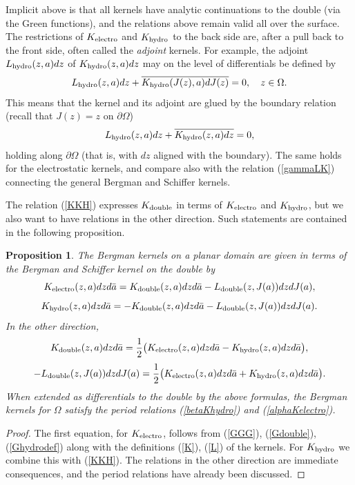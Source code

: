 \documentclass[reqno,12pt]{article}
\theoremstyle{plain}
\newtheorem{proposition}[thm]{Proposition}
\theoremstyle{definition}
\numberwithin{equation}{section}
\numberwithin{figure}{section}
\begin{document}
Implicit above is that all kernels have analytic continuations to the double (via the Green functions),
and the relations above remain valid all over the surface. The restrictions of $K_{\rm electro}$ and $K_{\rm hydro}$ 
to the back side are, after a pull back to the front side, often called the {\it adjoint} kernels.
For example, the adjoint $L_{\rm hydro}(z,a)dz$ of $K_{\rm hydro}(z,a)dz$ may  on the level of differentials be defined by 
\begin{equation}\label{adjointBergmanhydro}
L_{\rm hydro}(z,a)dz+\overline{K_{\rm hydro}(J(z),a)dJ(z)}=0, \quad z\in\Omega.
\end{equation}
This means that the kernel and its adjoint are glued by the boundary relation (recall that $J(z)=z$ on $\partial\Omega$)
\begin{equation}\label{LKboundary}
L_{\rm hydro}(z,a)dz+\overline{K_{\rm hydro}(z,a)dz}=0, 
\end{equation}
holding along $\partial\Omega$ (that is, with $dz$ aligned with the boundary). 
The same holds for the electrostatic kernels, and compare also with the
relation (\ref{gammaLK}) connecting the general Bergman and Schiffer kernels.

The relation (\ref{KKH}) expresses $K_{\rm double}$ in terms of $K_{\rm electro}$ and $K_{\rm hydro}$,
but we also want to have relations in the other direction. Such statements are contained in the following
proposition.

\begin{proposition}\label{prop:KKL}
The Bergman kernels on a planar domain are given in terms of the Bergman and Schiffer kernel on the double by
$$
K_{\rm electro}(z,a)dzd\bar{a}=K_{\rm double}(z,a)dzd\bar{a}-L_{\rm double}(z,J(a))dzdJ(a),
$$
$$
K_{\rm hydro}(z,a)dzd\bar{a}=-K_{\rm double}(z,a)dzd\bar{a}-L_{\rm double}(z,J(a))dzdJ(a).
$$
In the other direction,
$$
K_{\rm double}(z,a)dzd\bar{a}=\frac{1}{2}\big(K_{\rm electro}(z,a)dzd\bar{a}-K_{\rm hydro}(z,a)dzd\bar{a}\big),
$$
$$
-L_{\rm double}(z,J(a))dzdJ(a)=\frac{1}{2}\big(K_{\rm electro}(z,a)dzd\bar{a}+K_{\rm hydro}(z,a)dzd\bar{a}\big).
$$
When extended as differentials to the double by the above formulas, the Bergman kernels for $\Omega$
satisfy the period relations (\ref{betaKhydro}) and (\ref{alphaKelectro}).
\end{proposition}

\begin{proof}
The first equation, for $K_{\rm electro}$, follows from (\ref{GGG}), (\ref{Gdouble}), (\ref{Ghydrodef}) 
along with the definitions (\ref{K}), (\ref{L}) of the kernels. For $K_{\rm hydro}$ we combine this with (\ref{KKH}).
The relations in the other direction are immediate consequences, and the period relations have already been discussed.
\end{proof}
\end{document}
